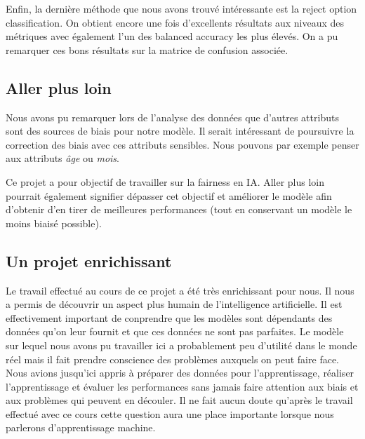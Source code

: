 \documentclass{article}
\begin{document}
    Enfin, la dernière méthode que nous avons trouvé intéressante est la reject option classification. On 
    obtient encore une fois d'excellents résultats aux niveaux des métriques avec également l'un des balanced 
    accuracy les plus élevés. On a pu remarquer ces bons résultats sur la matrice de confusion associée.

    \subsection{Aller plus loin}
    Nous avons pu remarquer lors de l'analyse des données que d'autres attributs sont des sources de biais pour 
    notre modèle. Il serait intéressant de poursuivre la correction des biais avec ces attributs 
    sensibles. Nous pouvons par exemple penser aux attributs \textit{âge} ou \textit{mois}. 
    
    Ce projet a pour objectif de travailler sur la fairness en IA. Aller plus loin pourrait également 
    signifier dépasser cet objectif et améliorer le modèle afin d'obtenir d'en tirer de meilleures 
    performances (tout en conservant un modèle le moins biaisé possible).

    \subsection{Un projet enrichissant}
    Le travail effectué au cours de ce projet a été très enrichissant pour nous. Il nous a permis de 
    découvrir un aspect plus humain de l'intelligence artificielle. Il est effectivement important de 
    conprendre que les modèles sont dépendants des données qu'on leur fournit et que ces données ne 
    sont pas parfaites. Le modèle sur lequel nous avons pu travailler ici a probablement peu d'utilité 
    dans le monde réel mais il fait prendre conscience des problèmes auxquels on peut faire face.
    Nous avions jusqu'ici appris à préparer des données pour l'apprentissage, réaliser l'apprentissage et
    évaluer les performances sans jamais faire attention aux biais et aux problèmes qui peuvent en découler.
    Il ne fait aucun doute qu'après le travail effectué avec ce cours cette question aura une place 
    importante lorsque nous parlerons d'apprentissage machine.


    \newpage
    \appendix
\end{document}
